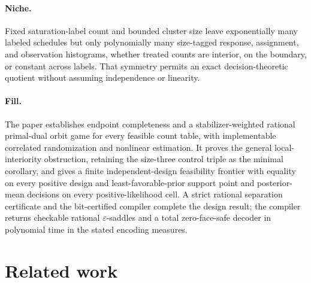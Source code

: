 \documentclass{article}
\begin{document}
\paragraph{Niche.} Fixed saturation-label count and bounded cluster size leave exponentially many labeled schedules but only polynomially many size-tagged response, assignment, and observation histograms, whether treated counts are interior, on the boundary, or constant across labels. That symmetry permits an exact decision-theoretic quotient without assuming independence or linearity.

\paragraph{Fill.} The paper establishes endpoint completeness and a stabilizer-weighted rational primal-dual orbit game for every feasible count table, with implementable correlated randomization and nonlinear estimation. It proves the general local-interiority obstruction, retaining the size-three control triple as the minimal corollary, and gives a finite independent-design feasibility frontier with equality on every positive design and least-favorable-prior support point and posterior-mean decisions on every positive-likelihood cell. A strict rational separation certificate and the bit-certified compiler complete the design result; the compiler returns checkable rational \(\varepsilon\)-saddles and a total zero-face-safe decoder in polynomial time in the stated encoding measures.

\section{Related work}
\end{document}
